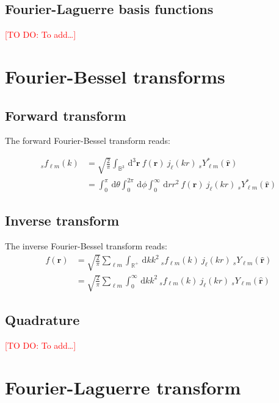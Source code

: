 \documentclass[a4paper,11pt]{article}
\newcommand{\realsnn}{\ensuremath{{\mathbb{R}^{+}}}}
\newcommand{\ball}{\ensuremath{{\mathbb{B}^3}}}
\newcommand{\dx}{\ensuremath{\mathrm{\,d}}}
\newcommand{\rvec}{{\boldsymbol{r}}}
\newcommand{\rang}{{\boldsymbol{\hat{r}}}}
\newcommand{\rlen}{{r}}
\newcommand{\todo}[1]{\textcolor{red}{[TO DO: #1]}}
\begin{document}
\subsection{Fourier-Laguerre basis functions}

\todo{To add\ldots}


\section{Fourier-Bessel transforms}



\subsection{Forward transform}

The forward Fourier-Bessel transform reads:

\begin{align}
  {}_s f_{\ell m}(k) 
  & = 
  \sqrt{\frac{2}{\pi}} 
  \int_{\ball} \dx ^3 \rvec \:
  f(\rvec) \:
  j_\ell(k\rlen) \:
  {}_s Y_{\ell m}^\ast(\rang) \\
  & =  
  \int_0^{\pi}\dx \theta 
  \int_0^{2\pi} \dx \phi
  \int_0^\infty \dx \rlen 
  \rlen^2 \:
  f(\rvec) \:
  j_\ell(k\rlen) \:
  {}_s Y_{\ell m}^\ast(\rang) 
\end{align}

\subsection{Inverse transform}

The inverse Fourier-Bessel transform reads:
\begin{align}
  f(\rvec) 
  & =  
  \sqrt{\frac{2}{\pi}} 
  \sum_{\ell m}
  \int_{\realsnn} \dx k k^2 \:
  {}_s f_{\ell m}(k) \:
  j_\ell(k\rlen) \:
  {}_s Y_{\ell m}(\rang) \\
  & =
  \sqrt{\frac{2}{\pi}} 
  \sum_{\ell m}
  \int_0^\infty \dx k k^2 \:
  {}_s f_{\ell m}(k) \:
  j_\ell(k\rlen) \:
  {}_s Y_{\ell m}(\rang) 
\end{align}

\subsection{Quadrature}

\todo{To add\ldots}

\section{Fourier-Laguerre transform}








\end{document}
